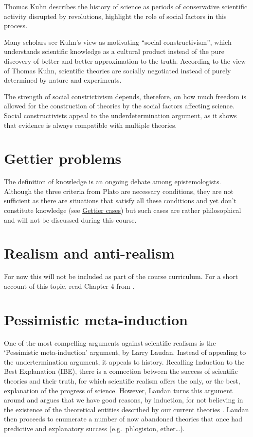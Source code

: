 \documentclass[
]{book}
\begin{document}
Thomas Kuhn describes the history of science as periods of conservative scientific activity disrupted by revolutions, highlight the role of social factors in this process.

Many scholars see Kuhn's view as motivating ``social constructivism'', which understands scientific knowledge as a cultural product instead of the pure discovery of better and better approximation to the truth. According to the view of Thomas Kuhn, scientific theories are socially negotiated instead of purely determined by nature and experiments.

The strength of social constrictivism depends, therefore, on how much freedom is allowed for the construction of theories by the social factors affecting science. Social constructivists appeal to the underdetermination argument, as it shows that evidence is always compatible with multiple theories.

\hypertarget{gettier-problems}{%
\section{Gettier problems}\label{gettier-problems}}

The definition of knowledge is an ongoing debate among epistemologists. Although the three criteria from Plato are necessary conditions, they are not sufficient as there are situations that satisfy all these conditions and yet don't constitute knowledge (see \href{https://en.wikipedia.org/wiki/Gettier_case}{Gettier cases}) but such cases are rather philosophical and will not be discussed during this course.

\hypertarget{realism}{%
\section{Realism and anti-realism}\label{realism}}

For now this will not be included as part of the course curriculum. For a short account of this topic, read Chapter 4 from \citep{okasha-pos}.

\hypertarget{pessimistic-meta-induction}{%
\section{Pessimistic meta-induction}\label{pessimistic-meta-induction}}

One of the most compelling arguments against scientific realisms is the `Pessimistic meta-induction' argument, by Larry Laudan. Instead of appealing to the undertermination argument, it appeals to history. Recalling Induction to the Best Explanation (IBE), there is a connection between the success of scientific theories and their truth, for which scientific realism offers the only, or the best, explanation of the progress of science. However, Laudan turns this argument around and argues that we have good reasons, by induction, for not believing in the existence of the theoretical entities described by our current theories \citep{ladyman2012understanding}. Laudan then proceeds to enumerate a number of now abandoned theories that once had predictive and explanatory success (e.g.~phlogiston, ether\ldots).
\end{document}
